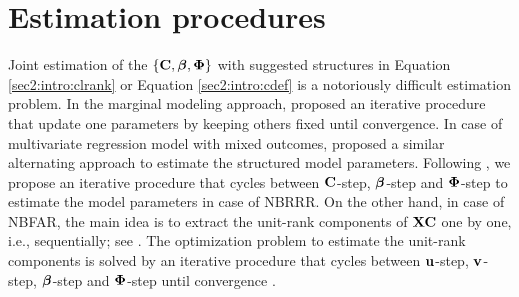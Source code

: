 \documentclass[12pt]{article}
\newcommand{\bbL}{\mathcal{L}}
\newcommand{\bs}{\boldsymbol}
\begin{document}
\section{Estimation procedures}\label{sec:compu}

Joint estimation of the $\{{\bf C}, \mbox{\boldmath $\beta$}, \mbox{\boldmath $\Phi$}\}$ with suggested structures in Equation \eqref{sec2:intro:clrank} or Equation \eqref{sec2:intro:cdef}    is a notoriously difficult estimation problem. In the marginal modeling approach, \citet{zeileis2008regression} proposed an iterative  procedure that  update one parameters by keeping others fixed until convergence. In case of multivariate regression model with mixed outcomes, \citet{chenandluo2017,mishra2017sequential} proposed a similar alternating approach to estimate the structured model parameters. Following \citet{chenandluo2017}, we propose an iterative procedure that cycles between  ${\bf C}$-step, $\mbox{\boldmath $\beta$}$-step and $\mbox{\boldmath $\Phi$}$-step   to  estimate the model parameters in case of NBRRR. On the other hand,  in case of NBFAR, the main idea is to extract the unit-rank components of ${\bf X}{\bf C}$ one by one, i.e., sequentially; see \citet{mishra2017sequential}.   The optimization problem to estimate the unit-rank components is solved by an iterative procedure that cycles between  ${\bf u}$-step, ${\bf v}$-step, $\mbox{\boldmath $\beta$}$-step and $\mbox{\boldmath $\Phi$}$-step until convergence   \citep{mishra2017sequential}. 








\end{document}

